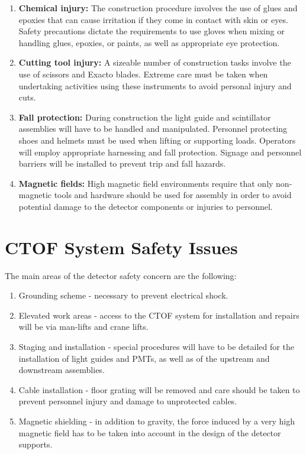 \begin{enumerate}

\item \textbf{Chemical injury:} The construction procedure involves the 
use of glues and epoxies that can cause irritation if they come in contact 
with skin or eyes.  Safety precautions dictate the requirements to use 
gloves when mixing or handling glues, epoxies, or paints, as well as 
appropriate eye protection.

\item \textbf{Cutting tool injury:} A sizeable number of construction tasks 
involve the use of scissors and Exacto blades.  Extreme care must be taken 
when undertaking activities using these instruments to avoid personal injury 
and cuts.

\item \textbf{Fall protection:} During construction the light guide and 
scintillator assemblies will have to be handled and manipulated.  Personnel 
protecting shoes and helmets must be used when lifting or supporting loads. 
Operators will employ appropriate harnessing and fall protection.  Signage
and personnel barriers will be installed to prevent trip and fall hazards.

\item \textbf{Magnetic fields:} High magnetic field environments require that 
only non-magnetic tools and hardware should be used for assembly in order to 
avoid potential damage to the detector components or injuries to personnel.
\end{enumerate}

\section{CTOF System Safety Issues}

The main areas of the detector safety concern are the following:

\begin{enumerate}

\item Grounding scheme - necessary to prevent electrical shock.

\item Elevated work areas - access to the CTOF system for installation
and repairs will be via man-lifts and crane lifts.  

\item Staging and installation - special procedures will have to be 
detailed for the installation of light guides and PMTs, as well as of the
upstream and downstream assemblies.

\item Cable installation - floor grating will be removed and care should be 
taken to prevent personnel injury and damage to unprotected cables.

\item Magnetic shielding - in addition to gravity, the force induced by a 
very high magnetic field has to be taken into account in the design of 
the detector supports.

\end{enumerate}

